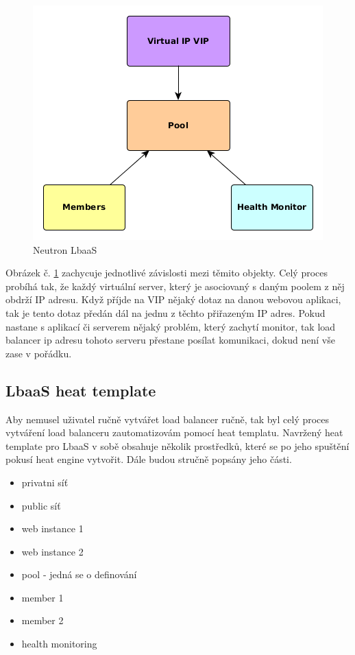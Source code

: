 \begin{figure}[h]
\begin{centering}
\includegraphics[scale=0.63]{images/NeutronLbaaS}
\par\end{centering}
\caption{Neutron LbaaS\label{fig:NeutronLbaaS}}
\end{figure}

Obrázek č. \ref{fig:NeutronLbaaS} zachycuje jednotlivé závislosti mezi těmito objekty. Celý proces probíhá tak, že každý virtuální server, který je asociovaný s daným poolem z něj obdrží IP adresu. Když příjde na VIP nějaký dotaz na danou webovou aplikaci, tak je tento dotaz předán dál na jednu z těchto přiřazeným IP adres. Pokud nastane s aplikací či serverem nějaký problém, který zachytí monitor, tak load balancer ip adresu tohoto serveru přestane posílat komunikaci, dokud není vše zase v pořádku.



\subsection{LbaaS heat template}

Aby nemusel uživatel ručně vytvářet load balancer ručně, tak byl celý proces vytváření load balanceru zautomatizovám pomocí heat templatu. Navržený heat template pro LbaaS v sobě obsahuje několik  prostředků, které se po jeho spuštění pokusí heat engine vytvořit. Dále budou stručně popsány jeho části.

\begin{itemize}
\item privatni síť
\item public síť
\item web instance 1
\item web instance 2
\item pool - jedná se o definování 
\item member 1
\item member 2
\item health monitoring
\end{itemize}


